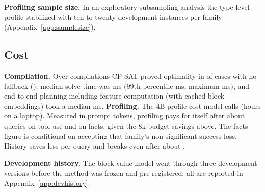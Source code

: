 \textbf{Profiling sample size.} In an exploratory subsampling analysis the type-level profile stabilized with ten to twenty development instances per family (Appendix~\ref{app:samplesize}).

\subsection{Cost}
\textbf{Compilation.} Over \RSolves compilations CP-SAT proved optimality in \RSolveOptimal of cases with no fallback
(\RSolveFallback); median solve time was \RSolveMedianMs{} ms (99th percentile \RSolveNinetyNineMs{} ms, maximum
\RSolveMaxMs{} ms), and end-to-end planning including feature computation (with cached block embeddings) took a median \RPlanMedianMs{} ms.
\textbf{Profiling.} The 4B profile cost \RProfCallsTotal model calls (\RProfHours hours on a laptop). Measured in
prompt tokens, profiling pays for itself after about \RBreakEvenTool queries on tool use and \RBreakEvenFacts on
facts, given the 8k-budget savings above. The facts figure is conditional on accepting that family's non-significant success loss. History saves less per query and breaks even after about
\RBreakEvenHistory.



\textbf{Development history.} The block-value model went through three development versions before the method was frozen and pre-registered; all are reported in Appendix~\ref{app:devhistory}.
